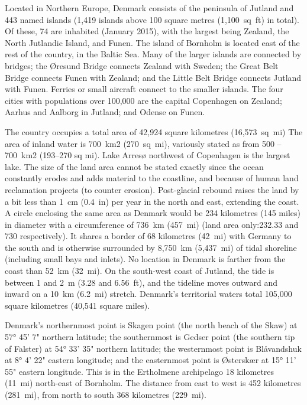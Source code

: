 Located in Northern Europe, Denmark consists of the peninsula of Jutland
and 443 named islands (1,419 islands above 100 square metres
(1,100~sq~ft) in total). Of these, 74 are inhabited (January 2015), with
the largest being Zealand, the North Jutlandic Island, and Funen. The
island of Bornholm is located east of the rest of the country, in the
Baltic Sea. Many of the larger islands are connected by bridges; the
Øresund Bridge connects Zealand with Sweden; the Great Belt Bridge
connects Funen with Zealand; and the Little Belt Bridge connects Jutland
with Funen. Ferries or small aircraft connect to the smaller islands.
The four cities with populations over 100,000 are the capital Copenhagen
on Zealand; Aarhus and Aalborg in Jutland; and Odense on Funen.

The country occupies a total area of 42,924 square kilometres
(16,573~sq~mi) The area of inland water is 700~km2 (270~sq~mi),
variously stated as from 500 -- 700~km2 (193--270 sq mi). Lake Arresø
northwest of Copenhagen is the largest lake. The size of the land area
cannot be stated exactly since the ocean constantly erodes and adds
material to the coastline, and because of human land reclamation
projects (to counter erosion). Post-glacial rebound raises the land by a
bit less than 1~cm (0.4~in) per year in the north and east, extending
the coast. A circle enclosing the same area as Denmark would be 234
kilometres (145 miles) in diameter with a circumference of 736~km
(457~mi) (land area only:232.33 and 730 respectively). It shares a
border of 68 kilometres (42~mi) with Germany to the south and is
otherwise surrounded by 8,750~km (5,437~mi) of tidal shoreline
(including small bays and inlets). No location in Denmark is farther
from the coast than 52~km (32~mi). On the south-west coast of Jutland,
the tide is between 1 and 2~m (3.28 and 6.56~ft), and the tideline moves
outward and inward on a 10~km (6.2~mi) stretch. Denmark's territorial
waters total 105,000 square kilometres (40,541 square miles).

Denmark's northernmost point is Skagen point (the north beach of the
Skaw) at 57° 45' 7" northern latitude; the southernmost is Gedser point
(the southern tip of Falster) at 54° 33' 35" northern latitude; the
westernmost point is Blåvandshuk at 8° 4' 22" eastern longitude; and the
easternmost point is Østerskær at 15° 11' 55" eastern longitude. This is
in the Ertholmene archipelago 18 kilometres (11~mi) north-east of
Bornholm. The distance from east to west is 452 kilometres (281~mi),
from north to south 368 kilometres (229~mi).

